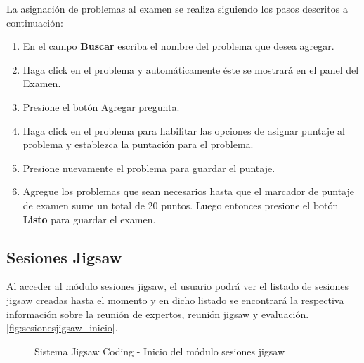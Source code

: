 La asignación de problemas al examen se realiza siguiendo los pasos descritos a continuación:

\begin{enumerate}
	\item En el campo \textbf{Buscar} escriba el nombre del problema que desea agregar.
	\item Haga click en el problema y automáticamente éste se mostrará en el panel del Examen.
	\item Presione el botón Agregar pregunta.
	\item Haga click en el problema para habilitar las opciones de asignar puntaje al problema y establezca la puntación para el problema. 
	\item Presione nuevamente el problema para guardar el puntaje.
	\item Agregue los problemas que sean necesarios hasta que el marcador de puntaje de examen sume un total de 20 puntos. Luego entonces presione el botón \textbf{Listo} para guardar el examen.
\end{enumerate}

\subsection{Sesiones Jigsaw}
Al acceder al módulo sesiones jigsaw, el usuario podrá ver el listado de sesiones jigsaw creadas hasta el momento y en dicho listado se encontrará la respectiva información sobre la reunión de expertos, reunión jigsaw y evaluación. \autoref{fig:sesionesjigsaw_inicio}.

\begin{figure}[h!]
\centering
\caption{Sistema Jigsaw Coding - Inicio del módulo sesiones jigsaw}
\label{fig:sesionesjigsaw_inicio}
\end{figure}
